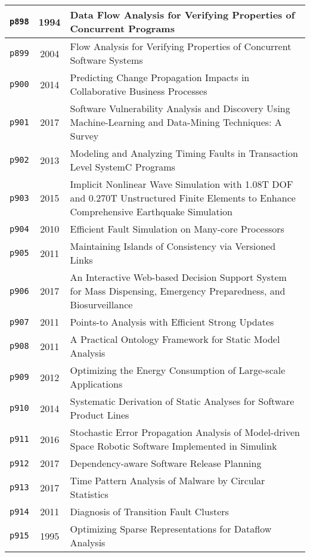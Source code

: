 \begin{longtable}{| c | c | p{16cm} |}
  \hline
  \texttt{p898} & 1994 & Data Flow Analysis for Verifying Properties of Concurrent Programs \\
  \hline
  \texttt{p899} & 2004 & Flow Analysis for Verifying Properties of Concurrent Software Systems \\
  \hline
  \texttt{p900} & 2014 & Predicting Change Propagation Impacts in Collaborative Business Processes \\
  \hline
  \texttt{p901} & 2017 & Software Vulnerability Analysis and Discovery Using Machine-Learning and Data-Mining Techniques: A Survey \\
  \hline
  \texttt{p902} & 2013 & Modeling and Analyzing Timing Faults in Transaction Level SystemC Programs \\
  \hline
  \texttt{p903} & 2015 & Implicit Nonlinear Wave Simulation with 1.08T DOF and 0.270T Unstructured Finite Elements to Enhance Comprehensive Earthquake Simulation \\
  \hline
  \texttt{p904} & 2010 & Efficient Fault Simulation on Many-core Processors \\
  \hline
  \texttt{p905} & 2011 & Maintaining Islands of Consistency via Versioned Links \\
  \hline
  \texttt{p906} & 2017 & An Interactive Web-based Decision Support System for Mass Dispensing, Emergency Preparedness, and Biosurveillance \\
  \hline
  \texttt{p907} & 2011 & Points-to Analysis with Efficient Strong Updates \\
  \hline
  \texttt{p908} & 2011 & A Practical Ontology Framework for Static Model Analysis \\
  \hline
  \texttt{p909} & 2012 & Optimizing the Energy Consumption of Large-scale Applications \\
  \hline
  \texttt{p910} & 2014 & Systematic Derivation of Static Analyses for Software Product Lines \\
  \hline
  \texttt{p911} & 2016 & Stochastic Error Propagation Analysis of Model-driven Space Robotic Software Implemented in Simulink \\
  \hline
  \texttt{p912} & 2017 & Dependency-aware Software Release Planning \\
  \hline
  \texttt{p913} & 2017 & Time Pattern Analysis of Malware by Circular Statistics \\
  \hline
  \texttt{p914} & 2011 & Diagnosis of Transition Fault Clusters \\
  \hline
  \texttt{p915} & 1995 & Optimizing Sparse Representations for Dataflow Analysis \\

\end{longtable}
